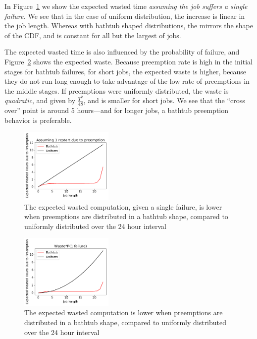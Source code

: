 In Figure~\ref{fig:vs-uniform} we show the expected wasted time \emph{assuming the job suffers a single failure.}
We see that in the case of uniform distribution, the increase is linear in the job length.
Whereas with bathtub shaped distributions, the mirrors the shape of the CDF, and is constant for all but the largest of jobs. 


The expected wasted time is also influenced by the probability of failure, and Figure~\ref{fig:vs-uniform-2} shows the expected waste.
Because preemption rate is high in the initial stages for bathtub failures, for short jobs, the expected waste is higher, because they do not run long enough to take advantage of the low rate of preemptions in the middle stages.
If preemptions were uniformly distributed, the waste is \emph{quadratic}, and given by $\frac{T^2}{48}$, and is smaller for short jobs. 
We see that the ``cross over'' point is around 5 hours---and for longer jobs, a bathtub preemption behavior is preferable.



\begin{figure}
  \includegraphics[width=0.4\textwidth]{../graphs/uniform-v-bathtub.pdf}
  \caption{The expected wasted computation, given a single failure, is lower when preemptions are distributed in a bathtub shape, compared to uniformly distributed over the 24 hour interval}
  \label{fig:vs-uniform}
\end{figure}

\begin{figure}
  \includegraphics[width=0.4\textwidth]{../graphs/uniform-v-bathtub-2.pdf}
  \caption{The expected wasted computation is lower when preemptions are distributed in a bathtub shape, compared to uniformly distributed over the 24 hour interval}
  \label{fig:vs-uniform-2}
\end{figure}

